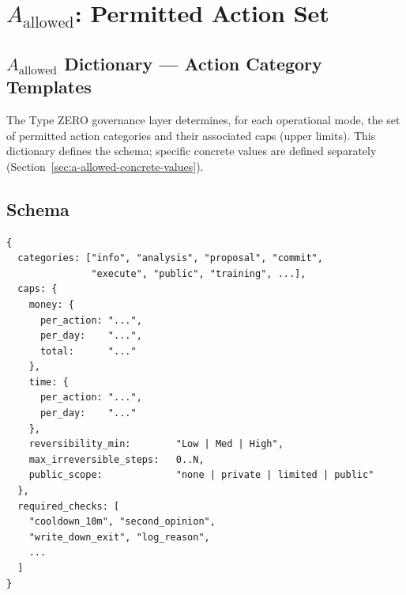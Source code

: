 
\chapter{$A_{\mathrm{allowed}}$: Permitted Action Set}
\label{ch:a-allowed}


\section{$A_{\mathrm{allowed}}$ Dictionary --- Action Category
Templates}
\label{sec:a-allowed-dictionary}

The Type ZERO governance layer determines, for each operational mode,
the set of permitted action categories and their associated caps
(upper limits). This dictionary defines the schema; specific concrete
values are defined separately (Section~\ref{sec:a-allowed-concrete-values}).

\section{Schema}
\label{sec:a-allowed-schema}

\begin{lstlisting}[basicstyle=\ttfamily\small,frame=single]
{
  categories: ["info", "analysis", "proposal", "commit",
               "execute", "public", "training", ...],
  caps: {
    money: {
      per_action: "...",
      per_day:    "...",
      total:      "..."
    },
    time: {
      per_action: "...",
      per_day:    "..."
    },
    reversibility_min:        "Low | Med | High",
    max_irreversible_steps:   0..N,
    public_scope:             "none | private | limited | public"
  },
  required_checks: [
    "cooldown_10m", "second_opinion",
    "write_down_exit", "log_reason",
    ...
  ]
}
\end{lstlisting}

